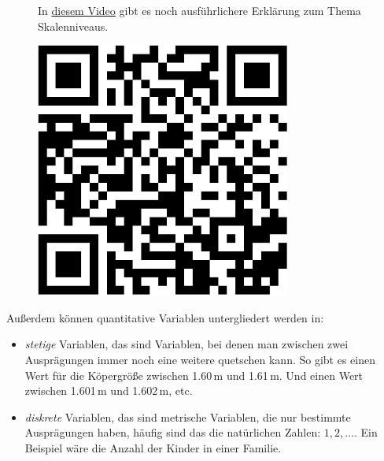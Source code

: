 \documentclass[
  a4paper,
]{scrbook}
\providecommand{\tightlist}{%
  \setlength{\itemsep}{0pt}\setlength{\parskip}{0pt}}\usepackage{longtable,booktabs,array}
\theoremstyle{definition}
\theoremstyle{definition}
\theoremstyle{definition}
\theoremstyle{remark}
\begin{document}
\begin{figure}

\begin{minipage}{0.80\linewidth}
In \href{https://www.youtube.com/watch?v=_mN3kFe56ng}{diesem Video} gibt
es noch ausführlichere Erklärung zum Thema Skalenniveaus.\end{minipage}%
%
\begin{minipage}{0.20\linewidth}

\begin{center}
\includegraphics[width=0.75\textwidth,height=\textheight]{010-rahmen_files/figure-pdf/unnamed-chunk-25-1.pdf}
\end{center}

\end{minipage}%

\end{figure}%

Außerdem können quantitative Variablen untergliedert werden in:

\begin{itemize}
\tightlist
\item
  \emph{stetige} Variablen, das sind Variablen, bei denen man zwischen
  zwei Ausprägungen immer noch eine weitere quetschen kann. So gibt es
  einen Wert für die Köpergröße zwischen 1.60\,m und 1.61\,m. Und einen
  Wert zwischen 1.601\,m und 1.602\,m, etc.
\item
  \emph{diskrete} Variablen, das sind metrische Variablen, die nur
  bestimmte Ausprägungen haben, häufig sind das die natürlichen Zahlen:
  \(1,2,...\). Ein Beispiel wäre die Anzahl der Kinder in einer Familie.
\end{itemize}
\end{document}
